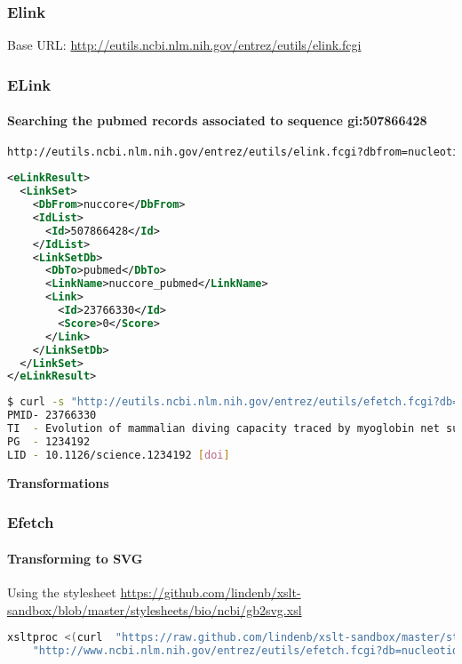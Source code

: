 \documentclass{beamer}
\newcommand{\centeredtitle}[1]{
\begin{center}
    \Huge{\bf{#1}}
\end{center}
}
\newcommand{\hugeslide}[1]{
\begin{frame}
\centeredtitle{#1}
\end{frame}
}
\begin{document}
\begin{frame}[fragile]
\frametitle{Elink}
Base URL:
\small
\url{http://eutils.ncbi.nlm.nih.gov/entrez/eutils/elink.fcgi}
\end{frame}


\begin{frame}[fragile]
\frametitle{ELink}
\framesubtitle{Searching the pubmed records associated to sequence gi:507866428}
\begin{lstlisting}[language=bash,basicstyle=\tiny,breaklines=true,escapechar=\!]
http://eutils.ncbi.nlm.nih.gov/entrez/eutils/elink.fcgi?dbfrom=nucleotide&db=pubmed&id=507866428&cmd=neighbor_score
\end{lstlisting}

\begin{lstlisting}[language=xml,basicstyle=\tiny,breaklines=true,escapechar=\%]
<eLinkResult>
  <LinkSet>
    <DbFrom>nuccore</DbFrom>
    <IdList>
      <Id>507866428</Id>
    </IdList>
    <LinkSetDb>
      <DbTo>pubmed</DbTo>
      <LinkName>nuccore_pubmed</LinkName>
      <Link>
        <Id>23766330</Id>
        <Score>0</Score>
      </Link>
    </LinkSetDb>
  </LinkSet>
</eLinkResult>

\end{lstlisting}

\begin{lstlisting}[language=bash,basicstyle=\tiny,breaklines=true,escapechar=\!]
$ curl -s "http://eutils.ncbi.nlm.nih.gov/entrez/eutils/efetch.fcgi?db=pubmed&id=23766330&rettype=medline&retmode=text"
PMID- 23766330
TI  - Evolution of mammalian diving capacity traced by myoglobin net surface charge.
PG  - 1234192
LID - 10.1126/science.1234192 [doi]
\end{lstlisting}
\end{frame}


\hugeslide{Transformations}

\begin{frame}[fragile]
\frametitle{Efetch}
\framesubtitle{Transforming to SVG}

Using the stylesheet \url{https://github.com/lindenb/xslt-sandbox/blob/master/stylesheets/bio/ncbi/gb2svg.xsl}

\begin{lstlisting}[language=bash,basicstyle=\tiny,breaklines=true,escapechar=\!]
xsltproc <(curl  "https://raw.github.com/lindenb/xslt-sandbox/master/stylesheets/bio/ncbi/gb2svg.xsl") \
	"http://www.ncbi.nlm.nih.gov/entrez/eutils/efetch.fcgi?db=nucleotide&id=14971102&retmode=xml&rettype=gbc"
\end{lstlisting}
\end{frame}
\end{document}
